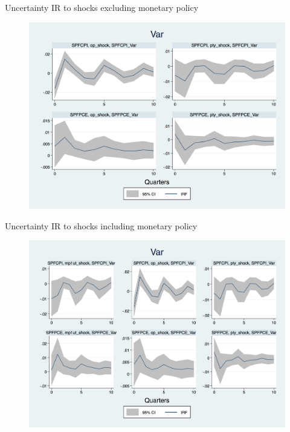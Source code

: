 \documentclass{beamer}
\begin{document}
\begin{frame}{Uncertainty IR to shocks excluding monetary policy}

\begin{figure}
	\includegraphics[scale=0.3]{figures/SPFVar_ashocks_nmp.png} 
\end{figure}

\end{frame}


\begin{frame}{Uncertainty IR to shocks including monetary policy}

\begin{figure}
	\includegraphics[scale=0.3]{figures/SPFVar_ashocks.png} 
\end{figure}

\end{frame}
\end{document}
